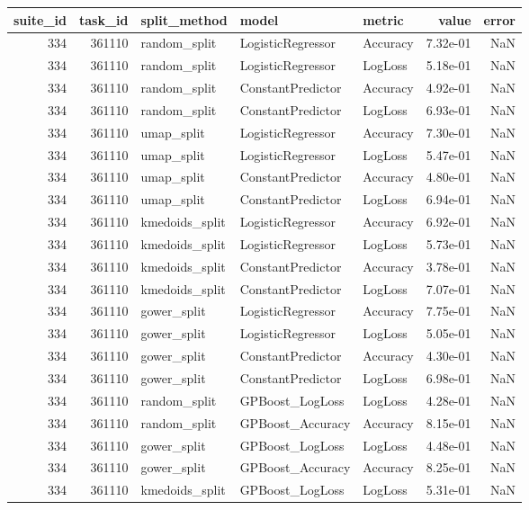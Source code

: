 \begin{tabular}{rrlllrr}
\toprule
suite\_id & task\_id & split\_method & model & metric & value & error \\
\midrule
334 & 361110 & random\_split & LogisticRegressor & Accuracy & 7.32e-01 & NaN \\
334 & 361110 & random\_split & LogisticRegressor & LogLoss & 5.18e-01 & NaN \\
334 & 361110 & random\_split & ConstantPredictor & Accuracy & 4.92e-01 & NaN \\
334 & 361110 & random\_split & ConstantPredictor & LogLoss & 6.93e-01 & NaN \\
334 & 361110 & umap\_split & LogisticRegressor & Accuracy & 7.30e-01 & NaN \\
334 & 361110 & umap\_split & LogisticRegressor & LogLoss & 5.47e-01 & NaN \\
334 & 361110 & umap\_split & ConstantPredictor & Accuracy & 4.80e-01 & NaN \\
334 & 361110 & umap\_split & ConstantPredictor & LogLoss & 6.94e-01 & NaN \\
334 & 361110 & kmedoids\_split & LogisticRegressor & Accuracy & 6.92e-01 & NaN \\
334 & 361110 & kmedoids\_split & LogisticRegressor & LogLoss & 5.73e-01 & NaN \\
334 & 361110 & kmedoids\_split & ConstantPredictor & Accuracy & 3.78e-01 & NaN \\
334 & 361110 & kmedoids\_split & ConstantPredictor & LogLoss & 7.07e-01 & NaN \\
334 & 361110 & gower\_split & LogisticRegressor & Accuracy & 7.75e-01 & NaN \\
334 & 361110 & gower\_split & LogisticRegressor & LogLoss & 5.05e-01 & NaN \\
334 & 361110 & gower\_split & ConstantPredictor & Accuracy & 4.30e-01 & NaN \\
334 & 361110 & gower\_split & ConstantPredictor & LogLoss & 6.98e-01 & NaN \\
334 & 361110 & random\_split & GPBoost\_LogLoss & LogLoss & 4.28e-01 & NaN \\
334 & 361110 & random\_split & GPBoost\_Accuracy & Accuracy & 8.15e-01 & NaN \\
334 & 361110 & gower\_split & GPBoost\_LogLoss & LogLoss & 4.48e-01 & NaN \\
334 & 361110 & gower\_split & GPBoost\_Accuracy & Accuracy & 8.25e-01 & NaN \\
334 & 361110 & kmedoids\_split & GPBoost\_LogLoss & LogLoss & 5.31e-01 & NaN \\

\end{tabular}
